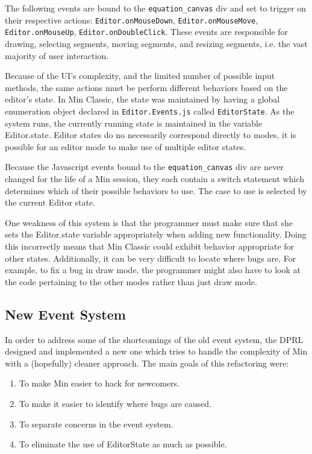 \documentclass[letterpaper]{article}
\begin{document}
The following events are bound to the \verb+equation_canvas+ div and set to trigger
on their respective actions:
\verb+Editor.onMouseDown+, \verb+Editor.onMouseMove+,
\verb+Editor.onMouseUp+, \verb+Editor.onDoubleClick+. These events are
responsible for drawing, selecting segments, moving segments, and resizing
segments, i.e. the vast majority of user interaction. 

Because of the UI's complexity, and the limited number of possible input
methods, the same actions must be perform different behaviors based on the
editor's state. In Min Classic, the state was maintained by having a global
enumeration object declared in \verb+Editor.Events.js+ called \verb+EditorState+.
As the system runs, the currently running state is maintained in the variable
Editor.state. Editor states do no necessarily correspond directly to modes, it
is possible for an editor mode to make use of multiple editor states. 

Because the Javascript events bound to the \verb+equation_canvas+ div are never
changed for the life of a Min session, they each contain a switch statement
which determines which of their possible behaviors to use. The case to use is
selected by the current Editor state.

One weakness of this system is that the programmer must make sure that she sets
the Editor.state variable appropriately when adding new functionality. Doing
this incorrectly means that Min Classic could exhibit behavior appropriate for
other states. Additionally, it can be very difficult to locate where bugs are.
For example, to fix a bug in draw mode, the programmer might also have to look
at the code pertaining to the other modes rather than just draw mode.  

\subsection*{New Event System}

In order to address some of the shortcomings of the old event system, the DPRL
designed and implemented a new one which tries to handle the complexity of Min
with a (hopefully) cleaner approach. The main goals of this refactoring were:

\begin{enumerate}
    \item To make Min easier to hack for newcomers.  
    \item To make it easier to identify where bugs are caused.
    \item To separate concerns in the event system.
    \item To eliminate the use of EditorState as much as possible.
\end{enumerate}
\end{document}
